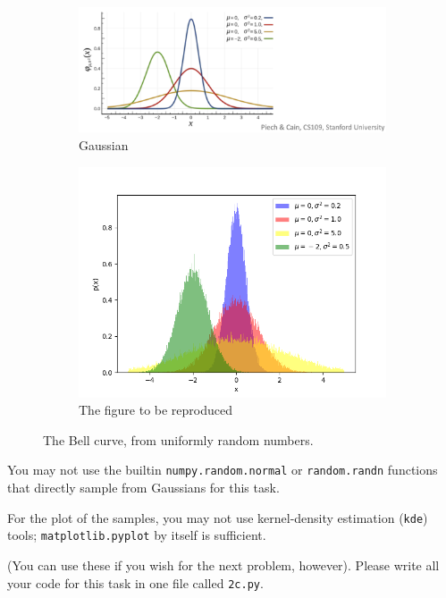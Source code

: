 \begin{tcolorbox}
    \begin{figure}[H]
        \centering
        \begin{subfigure}[l]{0.5\textwidth}
            \centering
            \includegraphics[width=\textwidth]{assets/images/q2c1.png}
            \caption{Gaussian}
            \label{fig_q2ca}
        \end{subfigure}
        \begin{subfigure}[r]{0.4\textwidth}
            \centering
            \includegraphics[width=\textwidth]{assets/images/q2c2.png}
            \caption{The figure to be reproduced}
            \label{fig_q2cb}
        \end{subfigure}
        \caption{The Bell curve, from uniformly random numbers.}
    \end{figure}
    
    You may not use the builtin \texttt{numpy.random.normal} or
    \texttt{random.randn} functions that directly sample from Gaussians for this
    task.
    
    For the plot of the samples, you may not use kernel-density estimation
    (\texttt{kde}) tools; \texttt{matplotlib.pyplot} by itself is sufficient.
    
    (You can use these if you wish for the next problem, however). Please write
    all your code for this task in one file called \texttt{2c.py}.
\end{tcolorbox}

